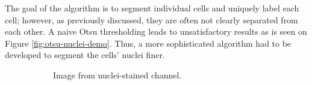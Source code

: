 \documentclass[
  digital,     %
  oneside,     %
  nosansbold,  %
  nocolorbold, %
  lof,         %
  lot,         %
]{fithesis4}
\begin{document}
The goal of the algorithm is to segment individual cells and uniquely label each
cell; however, as previously discussed, they are often not clearly separated
from each other. A naive Otsu thresholding leads to unsatisfactory results as is
seen on Figure \ref{fig:otsu-nuclei-demo}. Thus, a more sophisticated algorithm
had to be developed to segment the cells' nuclei finer.
\begin{figure}
    \begin{subfigure}[t]{0.45\textwidth}
        \centering
        \caption{Image from nuclei-stained channel.}
    \end{subfigure}
    \begin{subfigure}[t]{0.45\textwidth}
        \centering

\end{subfigure}
\end{figure}
\end{document}
